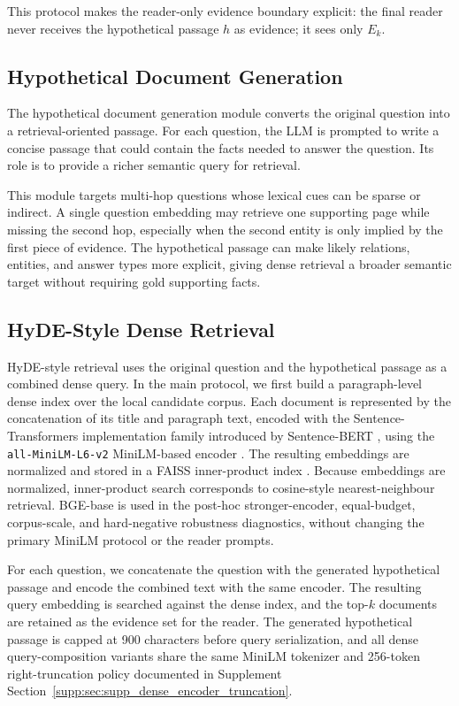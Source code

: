 This protocol makes the reader-only evidence boundary explicit: the final reader never receives the hypothetical passage $h$ as evidence; it sees only $E_k$.

\subsection{Hypothetical Document Generation}
\label{sec:hypothetical_document_generation}

The hypothetical document generation module converts the original question into a retrieval-oriented passage. For each question, the LLM is prompted to write a concise passage that could contain the facts needed to answer the question. Its role is to provide a richer semantic query for retrieval.

This module targets multi-hop questions whose lexical cues can be sparse or indirect. A single question embedding may retrieve one supporting page while missing the second hop, especially when the second entity is only implied by the first piece of evidence. The hypothetical passage can make likely relations, entities, and answer types more explicit, giving dense retrieval a broader semantic target without requiring gold supporting facts.

\subsection{HyDE-Style Dense Retrieval}
\label{sec:hyde_retrieval}

HyDE-style retrieval uses the original question and the hypothetical passage as a combined dense query. In the main protocol, we first build a paragraph-level dense index over the local candidate corpus. Each document is represented by the concatenation of its title and paragraph text, encoded with the Sentence-Transformers implementation family introduced by Sentence-BERT \cite{reimers2019sentencebert}, using the \texttt{all-MiniLM-L6-v2} MiniLM-based encoder \cite{wang2020minilm}. The resulting embeddings are normalized and stored in a FAISS inner-product index \cite{johnson2019billion}. Because embeddings are normalized, inner-product search corresponds to cosine-style nearest-neighbour retrieval. BGE-base is used in the post-hoc stronger-encoder, equal-budget, corpus-scale, and hard-negative robustness diagnostics, without changing the primary MiniLM protocol or the reader prompts.

For each question, we concatenate the question with the generated hypothetical passage and encode the combined text with the same encoder. The resulting query embedding is searched against the dense index, and the top-$k$ documents are retained as the evidence set for the reader. The generated hypothetical passage is capped at 900 characters before query serialization, and all dense query-composition variants share the same MiniLM tokenizer and 256-token right-truncation policy documented in Supplement Section~\ref{supp:sec:supp_dense_encoder_truncation}.

